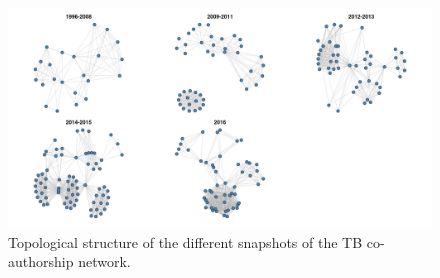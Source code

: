 \begin{figure}[!ht]
\hspace{-1.25cm}
\includegraphics[scale=0.4]{Chapters/tb/statMod/tb_dynNetwork}
\caption{Topological structure of the different snapshots of the TB co-authorship network.}
\label{fig:tb_dynNetwork}
\end{figure}

